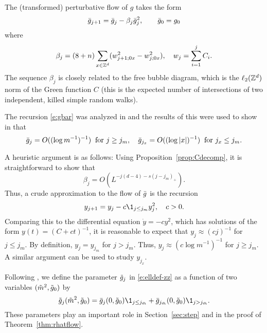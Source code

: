 The (transformed) perturbative flow of $g$ takes the form
\begin{equation}
\label{e:gbar}
\bar{g}_{j+1}
	=
\bar{g}_j - \beta_j  \bar{g}_j^{2}, \qquad \bar{g}_0
	=
g_0
\end{equation}
where
\begin{equation}
\beta_j = (8 + n) \sum_{x\in{ {{\mathbb Z}}^d }} (w_{j+1;0x}^2 - w_{j;0x}^2),
	\quad
w_j = \sum_{i=1}^j C_i.
\end{equation}
The sequence $\beta_j$ is closely related to the free bubble diagram,
which is the $\ell_2({ {{\mathbb Z}}^d })$ norm of the Green function $C$ (this is
the expected number of intersections of two independent, killed simple
random walks).


The recursion \eqref{e:gbar} was analyzed in \cite{BBS-rg-flow} and the
results of this were used to show in
\cite[Proposition~\ref{log-prop:approximate-flow}]{BBS-saw4-log}
that
\begin{equation}
\label{e:gjxgjmbd}
\bar{g}_{j}
	=
O((\log m^{-1})^{-1}) \;\; \text{for $j \geq j_m$},
	\quad
\bar{g}_{j_x}
	=
O((\log |x|)^{-1}) \;\; \text{for $j_x \leq j_m$.}
\end{equation}

\begin{rk}
A heuristic argument is as follows: Using Proposition~\ref{prop:Cdecomp}, it is
straightforward to show that
\begin{equation}
\beta_j = O(L^{-j (d - 4) - s (j - j_m)_+}).
\end{equation}
Thus, a crude approximation to the flow of $\bar{g}$ is the recursion
\begin{equation}
y_{j+1} = y_j - c \1_{j \le j_m} y_j^2,
	\quad
c > 0.
\end{equation}
Comparing this to the differential equation $\dot y = - c y^2$, which has solutions
of the form $y(t) = (C + c t)^{-1}$, it is reasonable to expect that $y_j \approx (c j)^{-1}$
for $j \le j_m$. By definition, $y_j = y_{j_m}$ for $j > j_m$. Thus,
$y_j \approx (c \log m^{-1})^{-1}$ for $j \ge j_m$. A similar argument can be used
to study $y_{j_x}$.
\end{rk}

Following \cite[\eqref{log-e:ggendef}]{BBS-saw4-log}, we define the parameter
$\tilde{g}_j$ in \eqref{e:elldef-zz} as a function of two variables $(\tilde{m}^2, \tilde{g}_0)$ by
\begin{equation}
\label{e:ggendef}
\ggen_j(\mgen^2,\ggen_0)
	=
\gbar_j(0,\ggen_0) \1_{j \le j_{\mgen}} + \gbar_{j_{\mgen}}(0,\ggen_0) \1_{j > j_{\mgen}}.
\end{equation}
These parameters play an important role in Section~\ref{sec:step} and in the proof of
Theorem~\ref{thm:rhatflow}.

